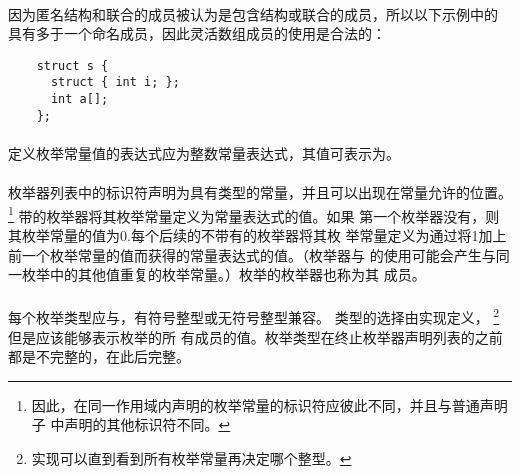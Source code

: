 {\paragraph{}
\ex 因为匿名结构和联合的成员被认为是包含结构或联合的成员，所以以下示例中的
具有多于一个命名成员，因此灵活数组成员的使用是合法的：
\begin{lstlisting}
    struct s {
      struct { int i; };
      int a[];
    };
\end{lstlisting}


\syntax
\paragraph{}

\constraint
\paragraph{}
定义枚举常量值的表达式应为整数常量表达式，其值可表示为。

\semantic
\paragraph{}
枚举器列表中的标识符声明为具有类型的常量，并且可以出现在常量允许的位置。
\footnote{因此，在同一作用域内声明的枚举常量的标识符应彼此不同，并且与普通声明子
中声明的其他标识符不同。} 带\tm{=}的枚举器将其枚举常量定义为常量表达式的值。如果
第一个枚举器没有\tm{=}，则其枚举常量的值为0.每个后续的不带有\tm{=}的枚举器将其枚
举常量定义为通过将1加上前一个枚举常量的值而获得的常量表达式的值。（枚举器与
\tm{=}的使用可能会产生与同一枚举中的其他值重复的枚举常量。）枚举的枚举器也称为其
成员。

\paragraph{}
每个枚举类型应与，有符号整型或无符号整型兼容。 类型的选择由实现定义，
\footnote{实现可以直到看到所有枚举常量再决定哪个整型。} 但是应该能够表示枚举的所
有成员的值。枚举类型在终止枚举器声明列表的\tm{\}}之前都是不完整的，在此后完整。

}
